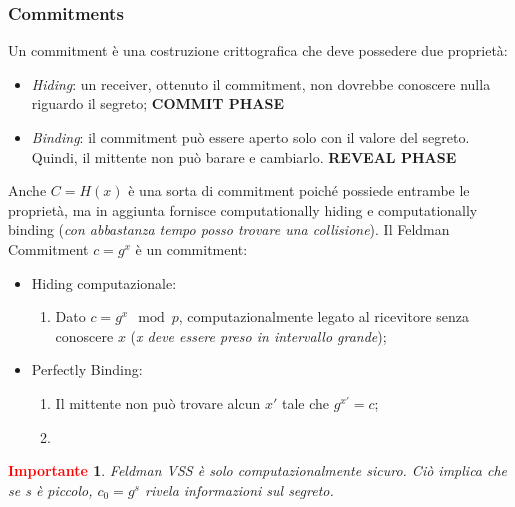 \documentclass{book}
\newtheorem*{Importante}{\textbf{\textcolor{red}{Importante}}}
\begin{document}
\subsubsection{Commitments}
Un commitment è una costruzione crittografica che deve possedere due proprietà:\begin{itemize}
    \item \emph{Hiding}: un receiver, ottenuto il commitment, non dovrebbe conoscere nulla riguardo il segreto; \textbf{COMMIT PHASE}
    \item \emph{Binding}: il commitment può essere aperto solo con il valore del segreto\@. Quindi, il mittente non può barare e cambiarlo. \textbf{REVEAL PHASE}
\end{itemize}
Anche \(C=H(x)\) è una sorta di commitment poiché possiede entrambe le proprietà, ma in aggiunta fornisce computationally hiding e computationally binding (\emph{con abbastanza tempo posso trovare una collisione})\@.\newline
Il Feldman Commitment \(c=g^{x}\) è un commitment:\begin{itemize}
    \item Hiding computazionale:\begin{enumerate}
              \item Dato \(c=g^{x}\mod{p}\), computazionalmente legato al ricevitore senza conoscere \(x\) (\emph{x deve essere preso in intervallo grande});
          \end{enumerate}
    \item Perfectly Binding:\begin{enumerate}
              \item Il mittente non può trovare alcun \(x'\) tale che \(g^{x'}=c\);
              \item
          \end{enumerate}

\end{itemize}
\begin{Importante}
    Feldman VSS è solo computazionalmente sicuro\@. Ciò implica che se s è piccolo, \(c_{0}=g^{s}\) rivela informazioni sul segreto.
\end{Importante}
\end{document}
